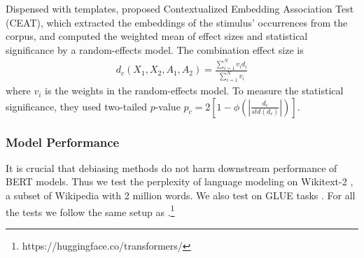 Dispensed with templates, \cite{guo2020detecting} proposed Contextualized Embedding Association Test (CEAT), which extracted the embeddings of the stimulus' occurrences from the corpus, and computed the weighted mean of effect sizes and statistical significance by a random-effects model. The combination effect size is
\begin{eqnarray}
d_c(X_1,X_2,A_1,A_2)=\frac{\sum_{i=1}^{N}v_id_i}{\sum_{i=1}^{N}v_i}\nonumber
\end{eqnarray} 
where $v_i$ is the weights in the random-effects model. To measure the statistical significance, they used two-tailed $p$-value $p_c = 2[1-\phi(|\frac{d_c}{std(d_c)}|)]$.


\subsubsection{Model Performance}
It is crucial that debiasing methods do not harm downstream
performance of BERT models. Thus we test the perplexity of
language modeling on Wikitext-2
\cite{merity2016pointer}, a subset of Wikipedia with 2
million words. We also test on GLUE tasks
\cite{wang2018glue}. For all the tests we follow the same
setup as
\cite{wolf2019huggingfaces}.\footnote{https://huggingface.co/transformers/}